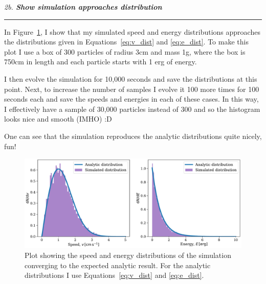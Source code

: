 \documentclass[12pt, letterpaper, twoside]{article}
\newcommand{\question}[1]{{\noindent \it #1}}
\newcommand{\answer}[1]{
    \par\noindent\rule{\textwidth}{0.4pt}#1\vspace{0.5cm}
}
\begin{document}
\question{2b. \textbf{Show simulation approaches distribution}}
\answer{
    In Figure~\ref{fig:2b}, I show that my simulated speed and energy distributions approaches the distributions given in Equations~\ref{eq:v_dist} and \ref{eq:e_dist}. To make this plot I use a box of 300 particles of radius 3cm and mass 1g, where the box is 750cm in length and each particle starts with 1 erg of energy.
    
    I then evolve the simulation for 10,000 seconds and save the distributions at this point. Next, to increase the number of samples I evolve it 100 more times for 100 seconds each and save the speeds and energies in each of these cases. In this way, I effectively have a sample of 30,000 particles instead of 300 and so the histogram looks nice and smooth (IMHO) :D
    
    One can see that the simulation reproduces the analytic distributions quite nicely, fun!
    \begin{figure}[htb]
        \centering
        \includegraphics[width=\textwidth]{figures/2b.pdf}
        \caption{Plot showing the speed and energy distributions of the simulation converging to the expected analytic result. For the analytic distributions I use Equations~\ref{eq:v_dist} and \ref{eq:e_dist}.}
        \label{fig:2b}
    \end{figure}
}
\end{document}
